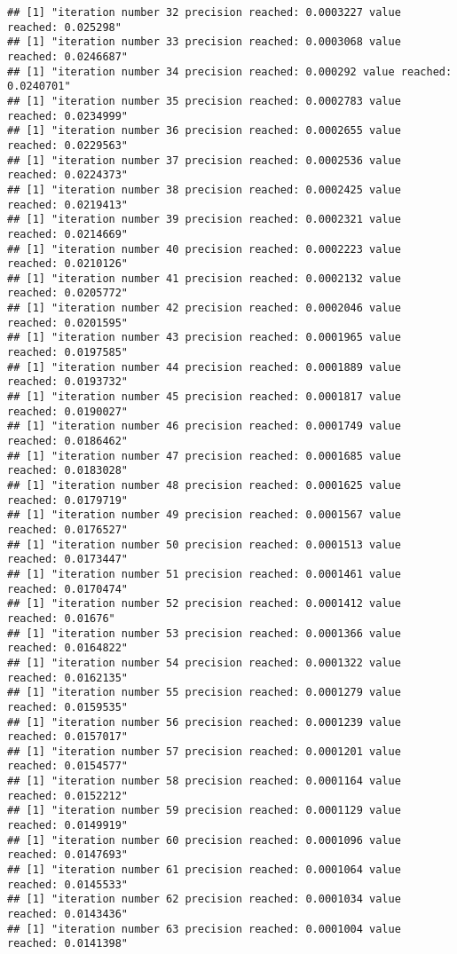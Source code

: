 \documentclass[
]{article}
\begin{document}
\begin{verbatim}
## [1] "iteration number 32 precision reached: 0.0003227 value reached: 0.025298"
## [1] "iteration number 33 precision reached: 0.0003068 value reached: 0.0246687"
## [1] "iteration number 34 precision reached: 0.000292 value reached: 0.0240701"
## [1] "iteration number 35 precision reached: 0.0002783 value reached: 0.0234999"
## [1] "iteration number 36 precision reached: 0.0002655 value reached: 0.0229563"
## [1] "iteration number 37 precision reached: 0.0002536 value reached: 0.0224373"
## [1] "iteration number 38 precision reached: 0.0002425 value reached: 0.0219413"
## [1] "iteration number 39 precision reached: 0.0002321 value reached: 0.0214669"
## [1] "iteration number 40 precision reached: 0.0002223 value reached: 0.0210126"
## [1] "iteration number 41 precision reached: 0.0002132 value reached: 0.0205772"
## [1] "iteration number 42 precision reached: 0.0002046 value reached: 0.0201595"
## [1] "iteration number 43 precision reached: 0.0001965 value reached: 0.0197585"
## [1] "iteration number 44 precision reached: 0.0001889 value reached: 0.0193732"
## [1] "iteration number 45 precision reached: 0.0001817 value reached: 0.0190027"
## [1] "iteration number 46 precision reached: 0.0001749 value reached: 0.0186462"
## [1] "iteration number 47 precision reached: 0.0001685 value reached: 0.0183028"
## [1] "iteration number 48 precision reached: 0.0001625 value reached: 0.0179719"
## [1] "iteration number 49 precision reached: 0.0001567 value reached: 0.0176527"
## [1] "iteration number 50 precision reached: 0.0001513 value reached: 0.0173447"
## [1] "iteration number 51 precision reached: 0.0001461 value reached: 0.0170474"
## [1] "iteration number 52 precision reached: 0.0001412 value reached: 0.01676"
## [1] "iteration number 53 precision reached: 0.0001366 value reached: 0.0164822"
## [1] "iteration number 54 precision reached: 0.0001322 value reached: 0.0162135"
## [1] "iteration number 55 precision reached: 0.0001279 value reached: 0.0159535"
## [1] "iteration number 56 precision reached: 0.0001239 value reached: 0.0157017"
## [1] "iteration number 57 precision reached: 0.0001201 value reached: 0.0154577"
## [1] "iteration number 58 precision reached: 0.0001164 value reached: 0.0152212"
## [1] "iteration number 59 precision reached: 0.0001129 value reached: 0.0149919"
## [1] "iteration number 60 precision reached: 0.0001096 value reached: 0.0147693"
## [1] "iteration number 61 precision reached: 0.0001064 value reached: 0.0145533"
## [1] "iteration number 62 precision reached: 0.0001034 value reached: 0.0143436"
## [1] "iteration number 63 precision reached: 0.0001004 value reached: 0.0141398"
\end{verbatim}
\end{document}
